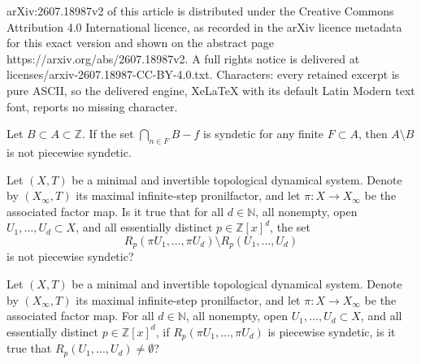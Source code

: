 \documentclass[10pt,a4paper]{amsart}
\def\N{{\mathbb N}}
\def\Z{{\mathbb Z}}
\begin{document}
arXiv:2607.18987v2 of this article is distributed under the Creative Commons Attribution 4.0 International licence, as recorded in the arXiv licence metadata for this exact version and shown on the abstract page https://arxiv.org/abs/2607.18987v2. A full rights notice is delivered at licenses/arxiv-2607.18987-CC-BY-4.0.txt. Characters: every retained excerpt is pure ASCII, so the delivered engine, XeLaTeX with its default Latin Modern text font, reports no missing character.
\begin{lemma}\label{A-B pws}
Let $B\subset A\subset \Z$. If the set $\bigcap_{n\in F}B-f$ is syndetic for any finite $F\subset A$, then $A\setminus B$ is not piecewise syndetic. 
\end{lemma}

\begin{question}\label{GKMLRR question}
Let $(X,T)$ be a minimal and invertible
topological dynamical system. Denote by $(X_{\infty},T)$ its 
maximal infinite-step pronilfactor, and let $\pi: X \to X_{\infty}$ be the associated factor map. Is it true that for all
$d\in \N$, all nonempty, open $U_1,\ldots,U_d \subset X$, and all 
essentially distinct $p\in \Z[x]^d$, the set 
\begin{equation}\label{set difference of return times question}
R_p(\pi U_1,\ldots,\pi U_d) \setminus R_p(U_1,\ldots,U_d)     
\end{equation}   
is not piecewise syndetic?
\end{question}

\begin{question}\label{Qiu strengthened}
Let $(X,T)$ be a minimal and invertible
topological dynamical system. Denote by $(X_{\infty},T)$ its maximal infinite-step pronilfactor, and let $\pi: X \to X_{\infty}$ be the associated factor map. For all $d\in \N$, all nonempty, open $U_1,\ldots,U_d \subset X$, and all 
essentially distinct $p\in \Z[x]^d$, if $R_p(\pi U_1,\ldots,\pi U_d )$ is piecewise syndetic, is it true that $R_p(U_1,\ldots,U_d) \neq \emptyset$? 
\end{question}
\end{document}
